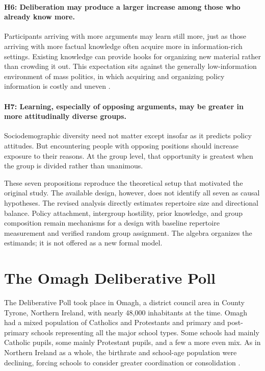 \documentclass{article}
\begin{document}
\paragraph{H6: Deliberation may produce a larger increase among those who already know more.}
Participants arriving with more arguments may learn still more, just as those arriving with
more factual knowledge often acquire more in information-rich settings. Existing knowledge can
provide hooks for organizing new material rather than crowding it out. This expectation sits
against the generally low-information environment of mass politics, in which acquiring and
organizing policy information is costly and uneven
\citep{downs1957economic,iyengar1990shortcuts,gilens2001political}.

\paragraph{H7: Learning, especially of opposing arguments, may be greater in more
attitudinally diverse groups.}
Sociodemographic diversity need not matter except insofar as it predicts policy attitudes. But
encountering people with opposing positions should increase exposure to their reasons. At the
group level, that opportunity is greatest when the group is divided rather than unanimous.

These seven propositions reproduce the theoretical setup that motivated the original study.
The available design, however, does not identify all seven as causal hypotheses. The revised
analysis directly estimates repertoire size and directional balance. Policy attachment,
intergroup hostility, prior knowledge, and group composition remain mechanisms for a design
with baseline repertoire measurement and verified random group assignment. The algebra
organizes the estimands; it is not offered as a new formal model.

\section{The Omagh Deliberative Poll}

The Deliberative Poll took place in Omagh, a district council area in County Tyrone, Northern
Ireland, with nearly 48,000 inhabitants at the time. Omagh had a mixed population of Catholics
and Protestants and primary and post-primary schools representing all the major school types.
Some schools had mainly Catholic pupils, some mainly Protestant pupils, and a few a more even
mix. As in Northern Ireland as a whole, the birthrate and school-age population were declining,
forcing schools to consider greater coordination or consolidation \citep{deni2007schools}.
\end{document}
